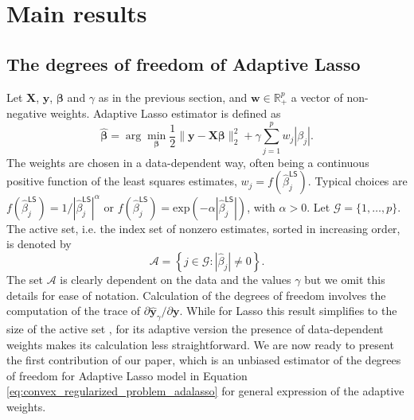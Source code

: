 \documentclass[a4paper, 12pt]{article}
\newcommand{\Aset}{\mathcal{A}}
\def\bbeta{\boldsymbol{\beta}}
\def\bw{\boldsymbol{w}}
\def\by{\boldsymbol{y}}
\def\bX{\mathbf{X}}
\def\bw{\mathbf{w}}
\def\by{\mathbf{y}}
\begin{document}
\section{Main results}
\label{sec:theory}
\subsection{The degrees of freedom of Adaptive Lasso}
\label{sec:adalasso}
%
Let $\bX$, $\by$, $\bbeta$ and $\gamma$ as in the previous section, and $\bw \in \mathbb{R}_+^p$ a vector of non-negative weights. Adaptive Lasso \citep{zou.2006} estimator is defined as 
\begin{equation}
\label{eq:convex_regularized_problem_adalasso}
\widehat{\bbeta} = \arg\min_{\bbeta} \frac{1}{2} \lVert {\by}  - {\bX}\boldsymbol{\beta} \rVert_2^2 + \gamma \sum_{j=1}^{p} w_{j} |\beta_j|. 
\end{equation}
The weights are chosen in a data-dependent way, often being a continuous positive function of the least squares estimates, $w_j=f(\widehat{\beta}^{\mathsf{LS}}_j)$. 
Typical choices are $f(\widehat{\beta}^{\mathsf{LS}}_j) = 1/|\widehat{\beta}^{\mathsf{LS}}_j|^\alpha$ or $f(\widehat{\beta}^{\mathsf{LS}}_j) = \text{exp}(-\alpha|\widehat{\beta}^{\mathsf{LS}}_j|)$, with $\alpha>0$. Let $\mathcal{G}=\{1,\dots,p\}$. The active set, i.e. the index set of nonzero estimates, sorted in increasing order, is denoted by
\begin{equation*}
\label{eq:dof_adalasso_Aset_def}
\Aset=\left\{j\in\mathcal{G}:|\widehat{\beta}_j| \neq 0\right\}.
\end{equation*}
The set $\Aset$ is clearly dependent on the data and the values $\gamma$ but we omit this details for ease of notation. Calculation of the degrees of freedom involves the computation of the trace of $\partial \widehat{\by}_\gamma / \partial \by$. While for Lasso this result simplifies to the size of the active set \citep{zou2007}, for its adaptive version the presence of data-dependent weights makes its calculation less straightforward. We are now ready to present the first  contribution of our paper, which is an unbiased estimator of the degrees of freedom for Adaptive Lasso model in Equation \eqref{eq:convex_regularized_problem_adalasso} for general expression of the adaptive weights.
%
\end{document}
